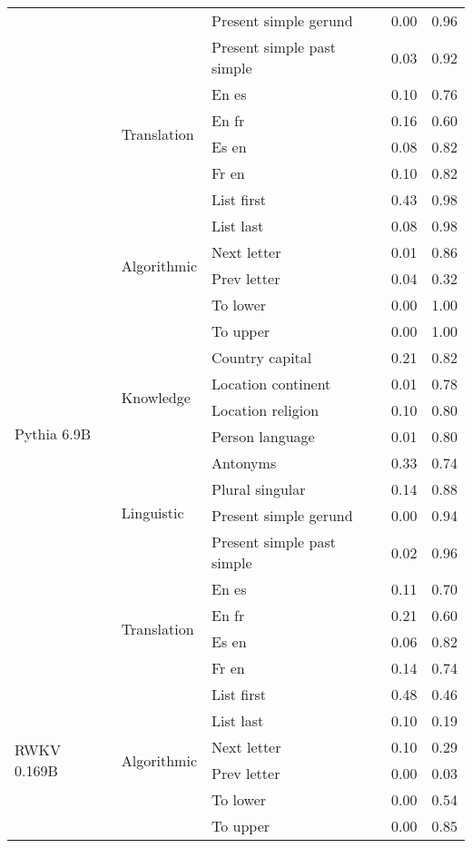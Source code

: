 \begin{center}
\begin{longtable}{lllrr}
 &  & Present simple gerund & 0.00 & 0.96 \\
 &  & Present simple past simple & 0.03 & 0.92 \\
\cline{2-5}
 & \multirow[t]{4}{*}{Translation} & En es & 0.10 & 0.76 \\
 &  & En fr & 0.16 & 0.60 \\
 &  & Es en & 0.08 & 0.82 \\
 &  & Fr en & 0.10 & 0.82 \\
\cline{1-5} \cline{2-5}
\multirow[t]{18}{*}{Pythia 6.9B} & \multirow[t]{6}{*}{Algorithmic} & List first & 0.43 & 0.98 \\
 &  & List last & 0.08 & 0.98 \\
 &  & Next letter & 0.01 & 0.86 \\
 &  & Prev letter & 0.04 & 0.32 \\
 &  & To lower & 0.00 & 1.00 \\
 &  & To upper & 0.00 & 1.00 \\
\cline{2-5}
 & \multirow[t]{4}{*}{Knowledge} & Country capital & 0.21 & 0.82 \\
 &  & Location continent & 0.01 & 0.78 \\
 &  & Location religion & 0.10 & 0.80 \\
 &  & Person language & 0.01 & 0.80 \\
\cline{2-5}
 & \multirow[t]{4}{*}{Linguistic} & Antonyms & 0.33 & 0.74 \\
 &  & Plural singular & 0.14 & 0.88 \\
 &  & Present simple gerund & 0.00 & 0.94 \\
 &  & Present simple past simple & 0.02 & 0.96 \\
\cline{2-5}
 & \multirow[t]{4}{*}{Translation} & En es & 0.11 & 0.70 \\
 &  & En fr & 0.21 & 0.60 \\
 &  & Es en & 0.06 & 0.82 \\
 &  & Fr en & 0.14 & 0.74 \\
\cline{1-5} \cline{2-5}
\multirow[t]{18}{*}{RWKV 0.169B} & \multirow[t]{6}{*}{Algorithmic} & List first & 0.48 & 0.46 \\
 &  & List last & 0.10 & 0.19 \\
 &  & Next letter & 0.10 & 0.29 \\
 &  & Prev letter & 0.00 & 0.03 \\
 &  & To lower & 0.00 & 0.54 \\
 &  & To upper & 0.00 & 0.85 \\
\cline{2-5}

\end{longtable}
\end{center}
